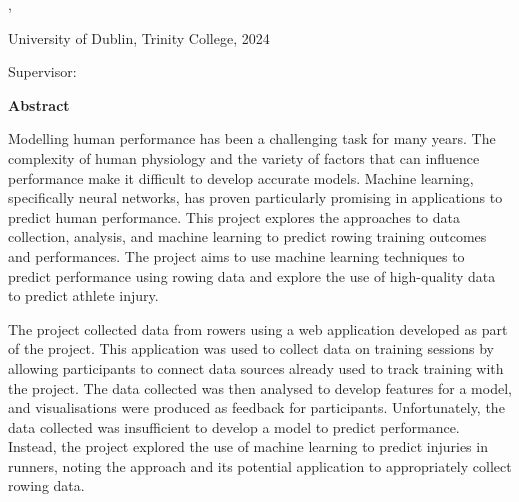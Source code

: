 \thispagestyle{plain}
\begin{center}
  \vspace{3cm}
  \textbf{\Huge\thesistitle}

  \begin{minipage}{12cm}
    \begin{center}
      \thesissubtitle
    \end{center}
  \end{minipage}

  \vspace{1cm}

  \authorname, \degree

  University of Dublin, Trinity College, 2024

  Supervisor: \supervisor

  \vspace{1.5cm}
  \textbf{Abstract}
\end{center}


Modelling human performance has been a challenging task for many years. The complexity of human physiology and the variety of factors that can influence performance make it difficult to develop accurate models. Machine learning, specifically neural networks, has proven particularly promising in applications to predict human performance. This project explores the approaches to data collection, analysis, and machine learning to predict rowing training outcomes and performances. The project aims to use machine learning techniques to predict performance using rowing data and explore the use of high-quality data to predict athlete injury. 

The project collected data from rowers using a web application developed as part of the project. This application was used to collect data on training sessions by allowing participants to connect data sources already used to track training with the project. The data collected was then analysed to develop features for a model, and visualisations were produced as feedback for participants. Unfortunately, the data collected was insufficient to develop a model to predict performance. Instead, the project explored the use of machine learning to predict injuries in runners, noting the approach and its potential application to appropriately collect rowing data.

